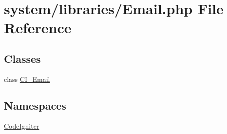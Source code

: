 \hypertarget{_email_8php}{}\section{system/libraries/\+Email.php File Reference}
\label{_email_8php}
\subsection*{Classes}
\begin{DoxyCompactItemize}
\item 
class \mbox{\hyperlink{class_c_i___email}{C\+I\+\_\+\+Email}}
\end{DoxyCompactItemize}
\subsection*{Namespaces}
\begin{DoxyCompactItemize}
\item 
 \mbox{\hyperlink{namespace_code_igniter}{Code\+Igniter}}
\end{DoxyCompactItemize}
